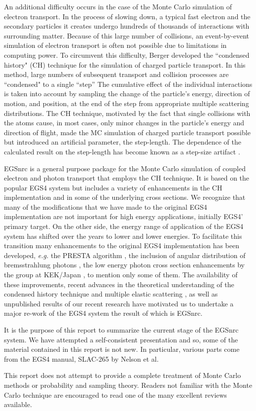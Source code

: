 An additional difficulty occurs in the case of the Monte Carlo
simulation of electron transport. In the process of slowing down,
a typical fast electron
and the secondary particles it creates
undergo hundreds of thousands of interactions with
surrounding matter.  Because of this large number of collisions,
an event-by-event simulation of electron transport is often
not possible due to limitations in computing power.  To
circumvent this difficulty, Berger \cite{Be63} developed the
``condensed history" (CH) technique for the simulation
of charged particle transport. In this method, large numbers of
subsequent transport and collision
processes are ``condensed" to a single ``step''
The cumulative effect of the individual interactions is taken
into account by sampling the change of the particle's energy,
direction of motion, and position, at the end of the step from appropriate
multiple scattering distributions.
The CH technique, motivated
by the fact that single collisions with the atoms cause, in most cases,
only minor changes in the particle's energy and direction of flight,
made the MC simulation of charged particle transport possible but introduced
an artificial parameter, the step-length. The dependence of the calculated
result on the step-length has become known as a step-size artifact
\cite{BR89}.

EGSnrc is a general purpose package for the Monte Carlo
simulation of coupled electron and photon transport that
employs the CH technique.
It is based on the popular EGS4 system \cite{Ne85}
but includes a variety of enhancements in the CH implementation
and in some of the underlying cross sections. We recognize that many
of the modifications that we have made to the original
EGS4 implementation are not important for
high energy applications, initially EGS4' primary target.
On the other side, the energy range of application of the
EGS4 system has shifted over the years to lower and lower
energies. To facilitate this transition many enhancements
to the original EGS4 implementation has been developed,
{\em e.g.} the PRESTA algorithm \cite{BR87}, the
inclusion of angular distribution of bremsstrahlung
photons \cite{Bi89}, the low energy photon cross section
enhancements by the group at KEK/Japan \cite{Na98}, to
mention only some of them. The availability of these
improvements, recent advances in the theoretical understanding
of the condensed history technique \cite{KB97a,Ka99a} and
multiple elastic scattering \cite{KB97}, as well as
unpublished results of our recent research have
motivated us to undertake a major re-work of the EGS4
system the result of which is EGSnrc.

It is the purpose of this report to summarize the current stage of the
EGSnrc system. We have attempted a self-consistent presentation
and so, some of the material contained in this report is
not new. In particular, various parts come from the EGS4 manual, SLAC-265
by Nelson et al\cite{Ne85}.

This report does not attempt to provide a complete treatment of Monte
Carlo methods or probability and sampling theory.
Readers not familiar with the Monte Carlo technique are encouraged to
read one of the many excellent reviews available.
